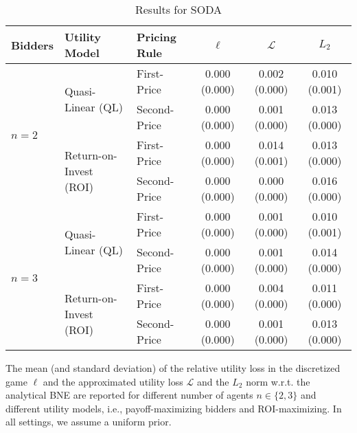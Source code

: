 \begin{table}[h]
	\caption{Results for SODA}
	\begin{center}
		\begin{tabular}{ l l l c c c }
			\toprule
			Bidders & Utility Model & Pricing Rule & $\ell$ &$ \mathcal L $ & $ L_2 $\\
			\midrule
			\multirow{4}{*}{$n=2$} &\multirow{2}{*}{Quasi-Linear (QL)} & First-Price & 0.000 (0.000) &  0.002 (0.000) & 0.010 (0.001) \\
			& & Second-Price & 0.000 (0.000) & 0.001 (0.000) & 0.013 (0.000) \\
			& \multirow{2}{*}{Return-on-Invest (ROI)} & First-Price & 0.000 (0.000) & 0.014 (0.001) & 0.013 (0.000)\\
			& & Second-Price & 0.000 (0.000) & 0.000 (0.000) & 0.016 (0.000) \\
			\midrule
			\multirow{4}{*}{$n=3$} &\multirow{2}{*}{Quasi-Linear (QL)} & First-Price & 0.000 (0.000) & 0.001 (0.000) & 0.010 (0.001) \\
			& & Second-Price & 0.000 (0.000) &0.001 (0.000) & 0.014 (0.000) \\
			& \multirow{2}{*}{Return-on-Invest (ROI)} & First-Price & 0.000 (0.000) & 0.004 (0.000) & 0.011 (0.000) \\
			& & Second-Price & 0.000 (0.000) & 0.001 (0.000) & 0.013 (0.000) \\
			\bottomrule
		\end{tabular}
	\end{center}
	\label{tab:results_soda}
	\footnotesize \vspace{1ex}
	The mean (and standard deviation) of the relative utility loss in the discretized game $\ell$ and the approximated utility loss $\mathcal L$ and the $L_2$ norm w.r.t. the analytical BNE are reported for different number of agents $n \in \{2,3\}$ and different utility models, i.e., payoff-maximizing bidders and ROI-maximizing. In all settings, we assume a uniform prior.
\end{table}